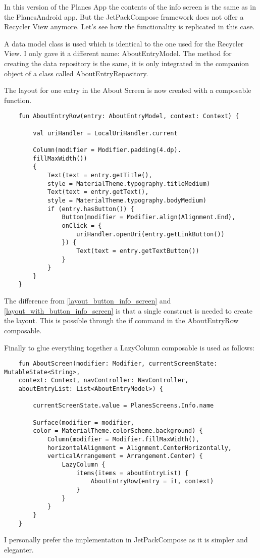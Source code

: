 In this version of the Planes App the contents of the info screen is the same as in the PlanesAndroid app. But the JetPackCompose framework does not offer a Recycler View anymore. Let's see how the functionality is replicated in this case.

A data model class is used which is identical to the one used for the Recycler View. I only gave it a different name: AboutEntryModel. The method for creating the data repository is the same, it is only integrated in the companion object of a class called AboutEntryRepository. 

The layout for one entry in the About Screen is now created with a composable function.

\begin{lstlisting}
	fun AboutEntryRow(entry: AboutEntryModel, context: Context) {
		
		val uriHandler = LocalUriHandler.current
		
		Column(modifier = Modifier.padding(4.dp).
		fillMaxWidth())
		{
			Text(text = entry.getTitle(),
			style = MaterialTheme.typography.titleMedium)
			Text(text = entry.getText(),
			style = MaterialTheme.typography.bodyMedium)
			if (entry.hasButton()) {
				Button(modifier = Modifier.align(Alignment.End),
				onClick = {
					uriHandler.openUri(entry.getLinkButton())
				}) {
					Text(text = entry.getTextButton())
				}
			}
		}
	}
\end{lstlisting}

The difference from \ref{layout_button_info_screen} and \ref{layout_with_button_info_screen} is that a single construct is needed to create the layout. This is possible through the if command in the AboutEntryRow composable.

Finally to glue everything together a LazyColumn composable is used as follows:

\begin{lstlisting}
	fun AboutScreen(modifier: Modifier, currentScreenState: MutableState<String>,
	context: Context, navController: NavController,
	aboutEntryList: List<AboutEntryModel>) {
		
		currentScreenState.value = PlanesScreens.Info.name
		
		Surface(modifier = modifier,
		color = MaterialTheme.colorScheme.background) {
			Column(modifier = Modifier.fillMaxWidth(),
			horizontalAlignment = Alignment.CenterHorizontally,
			verticalArrangement = Arrangement.Center) {
				LazyColumn {
					items(items = aboutEntryList) {
						AboutEntryRow(entry = it, context)
					}
				}
			}
		}
	}
\end{lstlisting}

I personally prefer the implementation in JetPackCompose as it is simpler and eleganter.